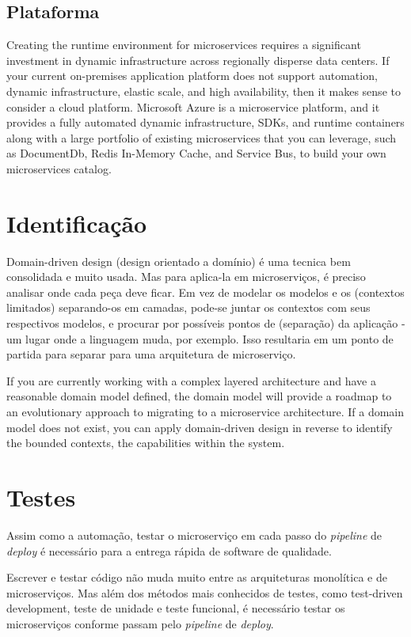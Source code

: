 \subsection{Plataforma}

Creating the runtime environment for microservices requires a significant investment in dynamic infrastructure across regionally disperse data centers. If your current on-premises application platform does not support automation, dynamic infrastructure, elastic scale, and high availability, then it makes sense to consider a cloud platform. Microsoft Azure is a microservice platform, and it provides a fully automated dynamic infrastructure, SDKs, and runtime containers along with a large portfolio of existing microservices that you can leverage, such as DocumentDb, Redis In-Memory Cache, and Service Bus, to build your own microservices catalog.

\section{Identificação}

Domain-driven design (design orientado a domínio) é uma tecnica bem consolidada e muito usada. Mas para aplica-la em microserviços, é preciso analisar onde cada peça deve ficar. Em vez de modelar os modelos e os (contextos limitados) separando-os em camadas, pode-se juntar os contextos com seus respectivos modelos, e procurar por possíveis pontos de (separação) da aplicação - um lugar onde a linguagem muda, por exemplo. Isso resultaria em um ponto de partida para separar para uma arquitetura de microserviço.

If you are currently working with a complex layered architecture and have a reasonable domain model defined, the domain model will provide a roadmap to an evolutionary approach to migrating to a microservice architecture. If a domain model does not exist, you can apply domain-driven design in reverse to identify the bounded contexts, the capabilities within the system.

\section{Testes}

Assim como a automação, testar o microserviço em cada passo do \emph{pipeline} de \emph{deploy} é necessário para a entrega rápida de software de qualidade.

Escrever e testar código não muda muito entre as arquiteturas monolítica e de microserviços. Mas além dos métodos mais conhecidos de testes, como test-driven development, teste de unidade e teste funcional, é necessário testar os microserviços conforme passam pelo \emph{pipeline} de \emph{deploy}.

